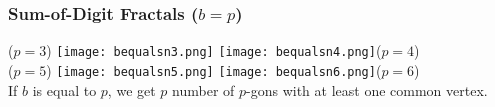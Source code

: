 \documentclass[leqno,handout]{beamer}
\begin{document}
\begin{frame}

\frametitle{Sum-of-Digit Fractals ($b = p$)} 

\begin{center}
($p = 3$) \texttt{[image: bequalsn3.png]}
\hspace{0.2in} \texttt{[image: bequalsn4.png]}($p=4$)
\\
($p = 5$) \texttt{[image: bequalsn5.png]}
\hspace{0.2in} \texttt{[image: bequalsn6.png]}($p=6$)
\\[0.1in] If $b$ is equal to $p$, we get $p$ number of $p$-gons with at least one common vertex. \end{center}
    
\end{frame}
\end{document}
